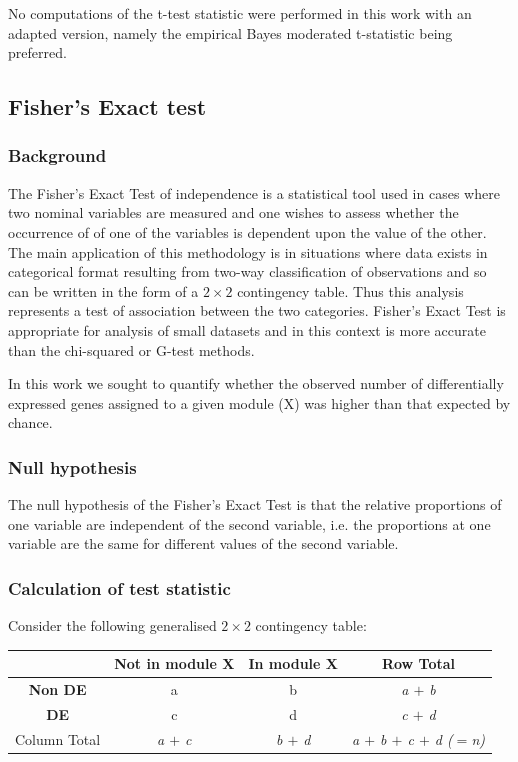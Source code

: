 
No computations of the t-test statistic were performed in this work with an adapted version, namely the empirical Bayes moderated t-statistic being preferred. 

\subsection{Fisher's Exact test}

\subsubsection{Background}

The Fisher's Exact Test of independence is a statistical tool used in cases where two nominal variables are measured and one wishes to assess whether the occurrence of of one of the variables is dependent upon the value of the other. The main application of this methodology is in situations where data exists in categorical format resulting from two-way classification of observations and so can be written in the form of a $2 \times 2$ contingency table. Thus this analysis represents a test of association between the two categories. Fisher's Exact Test is appropriate for analysis of small datasets and in this context is more accurate than the chi-squared or G-test methods. 

In this work we sought to quantify whether the observed number of differentially expressed genes assigned to a given module (X) was higher than that expected by chance. 

\subsubsection{Null hypothesis}

The null hypothesis of the Fisher's Exact Test is that the relative proportions of one variable are independent of the second variable, i.e. the proportions at one variable are the same for different values of the second variable. 

\subsubsection{Calculation of test statistic}

Consider the following generalised $2 \times 2$ contingency table:

\begin{center}
\begin{tabular}{ |c|c|c|c| } 
 \hline
  & \textbf{Not in module X} & \textbf{In module X} & Row Total \\ 
 \hline
 \textbf{Non DE} & a & b & \textit{a $+$ b} \\
 \hline
 \textbf{DE} & c & d & \textit{c $+$ d} \\
 \hline
Column Total & \textit{a $+$ c} & \textit{b $+$ d} & \textit{a $+$ b $+$ c $+$ d ($=$n)}\\
\hline
\end{tabular}
\end{center}

